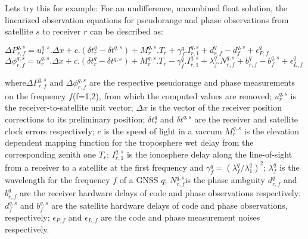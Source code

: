 \begin{fullwidth}
Lets try this for example:
For an undifference, uncombined float solution, the linearized observation equations for pseudorange and phase observations from satellite $s$ to receiver $r$ can be described as:

\begin{math}
\Delta P_{r,f}^{q,s} = u_r^{q,s} . \Delta x + c . (\delta t_r^q - \delta t^{q,s}) + M_r^{q,s} . T_r + \gamma_f^q . I_{r,1}^{q,s} + d_{r,f}^q - d_f^{q,s} + \epsilon_{P,f}^q
\end{math}\\
\begin{math}
\Delta\phi_{r,f}^{q,s} = u_r^{q,s} . \Delta x + c . (\delta t_r^q - \delta t^{q,s}) + M_r^{q,s} . T_r - \gamma_f^q . I_{r,1}^{q,s} + \lambda_f^q . N_{r,f}^{q,s} + b_{r,f}^q - b_f^{q,s} + \epsilon_{L,f}^q 
\end{math}

where$\Delta P_{r,f}^{q,s}$ and $\Delta\phi_{r,f}^{q,s}$ are the respective pseudorange and phase measurements on the frequency $f$(f=1,2), from which the computed values are removed;
$u_r^{q,s}$ is the receiver-to-satellite unit vector;
$\Delta x$ is the vector of the receiver position corrections to its preliminary position; 
$\delta t_r^q$ and $\delta t^{q,s}$ are the receiver and satellite clock errors respectively;
$c$ is the speed of light in a vaccum
$M_r^{q,s}$ is the elevation dependent mapping function for the troposphere wet delay from the corresponding zenith one $T_r$;
$I_{r,1}^{q,s}$ is the ionosphere delay along the line-of-sight from a receiver to a satellite at the first frequency and $\gamma_f^q = (\lambda_f^q / \lambda_1^q)^2$;
$\lambda_f^q$ is the wavelength for the frequency $f$ of a GNSS $q$;
$N_{r,f}^{q,s}$is the phase ambguity 
$d_{r,f}^q$ and $b_{r,f}^q$ are the receiver hardware delays of code and phase observations respectively;
$d_f^{q,s}$ and $b_f^{q,s}$ are the satellite hardware delays of code and phase observations, respectively;
$\epsilon_{P,f}$ and $\epsilon_{L,f}$ are the code and phase measurement noises respectively. 

\end{fullwidth}
